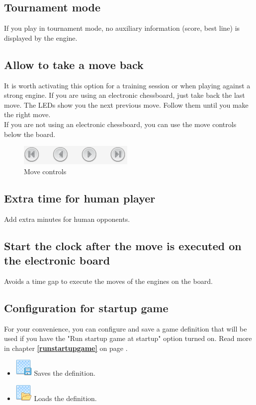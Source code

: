 \documentclass[11pt,a4paper]{article}
\begin{document}
\subsection{Tournament mode}
If you play in tournament mode, no auxiliary information (score, best line) is displayed by the engine.

\subsection{Allow to take a move back}
It is worth activating this option for a training session or when playing against a strong engine. If you are using an electronic chessboard, just take back the last move. The LEDs show you the next previous move. Follow them until you make the right move.\\
If you are not using an electronic chessboard, you can use the move controls below the board.

\begin{figure}[H]
	\centering
	\includegraphics[scale=1.0]{MoveControl.png}
	\caption{Move controls}
	\label{fig:MoveControl}
\end{figure}


\subsection{Extra time for human player}
Add extra minutes for human opponents.

\subsection{Start the clock after the move is executed on the electronic board}
Avoids a time gap to execute the moves of the engines on the board.

\subsection{Configuration for startup game} \label{startupgame}

For your convenience, you can configure and save a game definition that will be used if you have the "Run startup game at startup" option turned on.  Read more in chapter \textbf{\ref{runstartupgame}  } on page \pageref{runstartupgame}.

\begin{itemize}
	  \item \includegraphics[scale=0.5]{layer_save.png} Saves the definition.
  	  \item \includegraphics[scale=0.5]{layer_open.png} Loads the definition.
\end{itemize}
\end{document}
